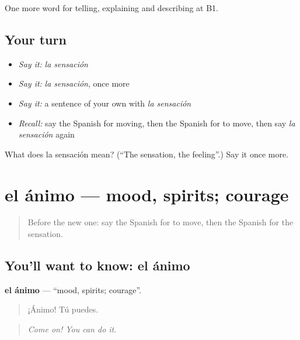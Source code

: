 \begin{grammarlens}[title={What you've built}]
One more word for telling, explaining and describing at B1.
\end{grammarlens}

\subsection*{Your turn}
\begin{itemize}
\raggedright
  \item \emph{Say it:} \emph{la sensación}
  \item \emph{Say it:} \emph{la sensación}, once more
  \item \emph{Say it:} a sentence of your own with \emph{la sensación}
  \item \emph{Recall:} say the Spanish for moving, then the Spanish for to move, then say \emph{la sensación} again
\end{itemize}

\begin{tcolorbox}[breakable,colback=teal!4,colframe=teal!35!black,title={Before you move on}]
What does la sensación mean? (\textquotedblleft{}The sensation, the feeling\textquotedblright{}.) Say it once more.
\end{tcolorbox}
\section[el ánimo]{el ánimo — mood, spirits; courage}

\label{lesson:ES-C712-animo}



\begin{quote}
Before the new one: say the Spanish for to move, then the Spanish for the sensation.
\end{quote}

\subsection*{You'll want to know: el ánimo}
\textbf{el ánimo} — \textquotedblleft{}mood, spirits; courage\textquotedblright{}.

\begin{quote}
¡Ánimo! Tú puedes.
\end{quote}

\begin{quote}
\emph{Come on! You can do it.}
\end{quote}

